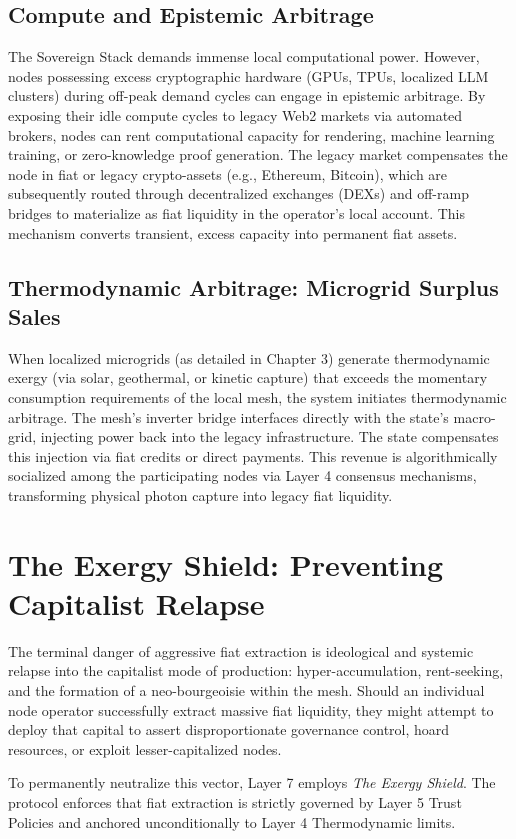 \subsection{Compute and Epistemic Arbitrage}
The Sovereign Stack demands immense local computational power. However, nodes possessing excess cryptographic hardware (GPUs, TPUs, localized LLM clusters) during off-peak demand cycles can engage in epistemic arbitrage. By exposing their idle compute cycles to legacy Web2 markets via automated brokers, nodes can rent computational capacity for rendering, machine learning training, or zero-knowledge proof generation. The legacy market compensates the node in fiat or legacy crypto-assets (e.g., Ethereum, Bitcoin), which are subsequently routed through decentralized exchanges (DEXs) and off-ramp bridges to materialize as fiat liquidity in the operator's local account. This mechanism converts transient, excess capacity into permanent fiat assets.

\subsection{Thermodynamic Arbitrage: Microgrid Surplus Sales}
When localized microgrids (as detailed in Chapter 3) generate thermodynamic exergy (via solar, geothermal, or kinetic capture) that exceeds the momentary consumption requirements of the local mesh, the system initiates thermodynamic arbitrage. The mesh's inverter bridge interfaces directly with the state's macro-grid, injecting power back into the legacy infrastructure. The state compensates this injection via fiat credits or direct payments. This revenue is algorithmically socialized among the participating nodes via Layer 4 consensus mechanisms, transforming physical photon capture into legacy fiat liquidity.

\section{The Exergy Shield: Preventing Capitalist Relapse}
The terminal danger of aggressive fiat extraction is ideological and systemic relapse into the capitalist mode of production: hyper-accumulation, rent-seeking, and the formation of a neo-bourgeoisie within the mesh. Should an individual node operator successfully extract massive fiat liquidity, they might attempt to deploy that capital to assert disproportionate governance control, hoard resources, or exploit lesser-capitalized nodes.

To permanently neutralize this vector, Layer 7 employs \textit{The Exergy Shield}. The protocol enforces that fiat extraction is strictly governed by Layer 5 Trust Policies and anchored unconditionally to Layer 4 Thermodynamic limits.

